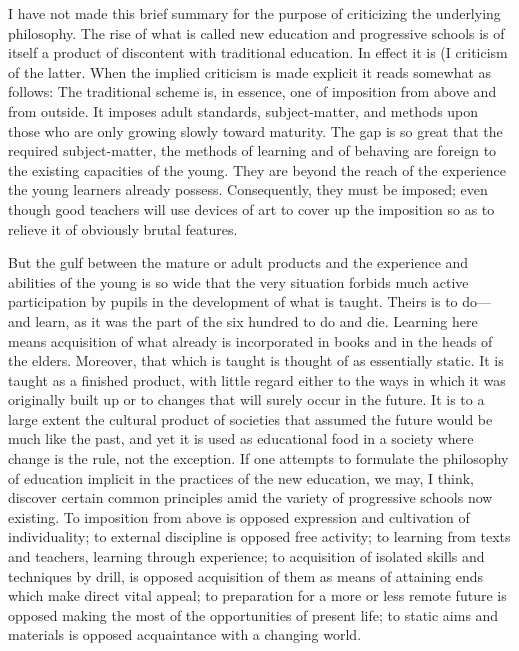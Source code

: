 I have not made this brief summary for the purpose of criticizing the underlying 
philosophy. The rise of what is called new education and progressive schools is of itself a 
product of discontent with traditional education. In effect it is (I criticism of the latter. 
When the implied criticism is made explicit it reads somewhat as follows: The traditional scheme is, in essence, one of imposition from above and from outside. It imposes adult 
standards, subject-matter, and methods upon those who are only growing slowly toward 
maturity. The gap is so great that the required subject-matter, the methods of learning and 
of behaving are foreign to the existing capacities of the young. They are beyond the reach 
of the experience the young learners already possess. Consequently, they must be 
imposed; even though good teachers will use devices of art to cover up the imposition so 
as to relieve it of obviously brutal features. 

But the gulf between the mature or adult products and the experience and abilities of 
the young is so wide that the very situation forbids much active participation by pupils in 
the development of what is taught. Theirs is to do— and learn, as it was the part of the six 
hundred to do and die. Learning here means acquisition of what already is incorporated in 
books and in the heads of the elders. Moreover, that which is taught is thought of as 
essentially static. It is taught as a finished product, with little regard either to the ways in 
which it was originally built up or to changes that will surely occur in the future. It is to a 
large extent the cultural product of societies that assumed the future would be much like 
the past, and yet it is used as educational food in a society where change is the rule, not 
the exception. If one attempts to formulate the philosophy of education implicit in the 
practices of the new education, we may, I think, discover certain common principles amid 
the variety of progressive schools now existing. To imposition from above is opposed 
expression and cultivation of individuality; to external discipline is opposed free activity; 
to learning from texts and teachers, learning through experience; to acquisition of isolated 
skills and techniques by drill, is opposed acquisition of them as means of attaining ends 
which make direct vital appeal; to preparation for a more or less remote future is opposed 
making the most of the opportunities of present life; to static aims and materials is 
opposed acquaintance with a changing world. 

